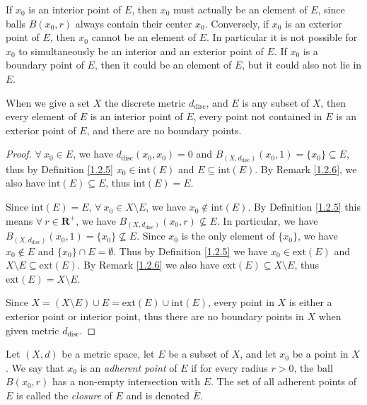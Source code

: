 \begin{remark}\label{1.2.6}
    If \(x_0\) is an interior point of \(E\), then \(x_0\) must actually be an element of \(E\), since balls \(B(x_0, r)\) always contain their center \(x_0\).
    Conversely, if \(x_0\) is an exterior point of \(E\), then \(x_0\) cannot be an element of \(E\).
    In particular it is not possible for \(x_0\) to simultaneously be an interior and an exterior point of \(E\).
    If \(x_0\) is a boundary point of \(E\), then it could be an element of \(E\), but it could also not lie in \(E\).
\end{remark}

\setcounter{theorem}{7}
\begin{example}\label{1.2.8}
    When we give a set \(X\) the discrete metric \(d_{\text{disc}}\), and \(E\) is any subset of \(X\), then every element of \(E\) is an interior point of \(E\), every point not contained in \(E\) is an exterior point of \(E\), and there are no boundary points.
\end{example}

\begin{proof}
    \(\forall\ x_0 \in E\), we have \(d_{\text{disc}}(x_0, x_0) = 0\) and \(B_{(X, d_{\text{disc}})}(x_0, 1) = \{x_0\} \subseteq E\), thus by Definition \ref{1.2.5} \(x_0 \in \text{int}(E)\) and \(E \subseteq \text{int}(E)\).
    By Remark \ref{1.2.6}, we also have \(\text{int}(E) \subseteq E\), thus \(\text{int}(E) = E\).

    Since \(\text{int}(E) = E\), \(\forall\ x_0 \in X \setminus E\), we have \(x_0 \notin \text{int}(E)\).
    By Definition \ref{1.2.5} this means \(\forall\ r \in \mathbf{R}^+\), we have \(B_{(X, d_{\text{disc}})}(x_0, r) \not\subseteq E\).
    In particular, we have \(B_{(X, d_{\text{disc}})}(x_0, 1) = \{x_0\} \not\subseteq E\).
    Since \(x_0\) is the only element of \(\{x_0\}\), we have \(x_0 \notin E\) and \(\{x_0\} \cap E = \emptyset\).
    Thus by Definition \ref{1.2.5} we have \(x_0 \in \text{ext}(E)\) and \(X \setminus E \subseteq \text{ext}(E)\).
    By Remark \ref{1.2.6} we also have \(\text{ext}(E) \subseteq X \setminus E\), thus \(\text{ext}(E) = X \setminus E\).

    Since \(X = (X \setminus E) \cup E = \text{ext}(E) \cup \text{int}(E)\), every point in \(X\) is either a exterior point or interior point, thus there are no boundary points in \(X\) when given metric \(d_{\text{disc}}\).
\end{proof}

\begin{definition}[Closure]\label{1.2.9}
    Let \((X, d)\) be a metric space, let \(E\) be a subset of \(X\), and let \(x_0\) be a point in \(X\).
    We say that \(x_0\) is an \emph{adherent point} of \(E\) if for every radius \(r > 0\), the ball \(B(x_0, r)\) has a non-empty intersection with \(E\).
    The set of all adherent points of \(E\) is called the \emph{closure} of \(E\) and is denoted \(\overline{E}\).
\end{definition}

